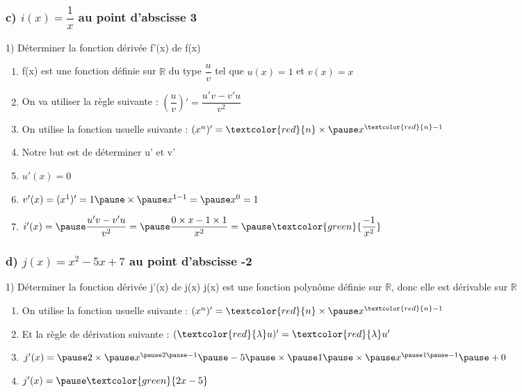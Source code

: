 \documentclass[t]{beamer}
\begin{document}
	\begin{frame}
		\frametitle{c) $i(x) = \dfrac{1}{x}$ au point d'abscisse 3}
		\begin{block}{1) Déterminer la fonction dérivée f'(x) de f(x)}
			\pause
			\begin{enumerate}[]
				\pause
				\item f(x) est une fonction définie sur $\mathbb{R}$ du type $\dfrac{u}{v}$ tel que $u(x) = 1$ et $v(x)=x$
				\pause
				\item On va utiliser la règle suivante : $\left( \dfrac{u}{v} \right)' = \dfrac{u'v-v'u}{v^2} $
				\pause
				\item On utilise la fonction usuelle suivante : \pause $ (x^n)' = \textcolor{red}{n} \times \pause x^{\textcolor{red}{n}-1} $
				\item Notre but est de déterminer u' et v'
				\pause
				\item \(u'(x) = 0\)
				\pause
				\item \(v'(x) = (x^1)' = 1 \pause \times \pause x^{1-1} = \pause x^0 = 1\)
				\pause 
				\item \(i'(x) = \pause \dfrac{u'v-v'u}{v^2} = \pause \dfrac{0 \times x- 1 \times 1}{x^2} = \pause \textcolor{green}{\dfrac{-1}{x^2}} \)
			\end{enumerate}
		\end{block}
	\end{frame}

	\begin{frame}
		\frametitle{d) $j(x) = x^2 - 5x +7$ au point d'abscisse -2}
		\begin{block}{1) Déterminer la fonction dérivée j'(x) de j(x)}
			\pause
			j(x) est une fonction polynôme définie sur $\mathbb{R}$, \pause donc elle est dérivable sur $\mathbb{R}$
			\begin{enumerate}[]
				\pause
				\item On utilise la fonction usuelle suivante : \pause $ (x^n)' = \textcolor{red}{n} \times \pause x^{\textcolor{red}{n}-1} $
				\pause
				\item Et la règle de dérivation suivante : \pause $ (\textcolor{red}{\lambda} u)' = \textcolor{red}{\lambda} u' $
				\pause
				\item \(j'(x) = \pause 2 \times \pause x^{ \pause 2 \pause -1} \pause - 5 \pause \times \pause 1 \pause \times \pause x^{\pause 1 \pause -1} \pause + 0 \)
				\pause
				\item \(j'(x) = \pause \textcolor{green}{2x - 5} \)
			\end{enumerate}
		\end{block}
	\end{frame}
\end{document}

